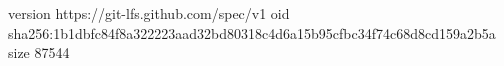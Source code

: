 version https://git-lfs.github.com/spec/v1
oid sha256:1b1dbfc84f8a322223aad32bd80318c4d6a15b95cfbc34f74c68d8cd159a2b5a
size 87544
